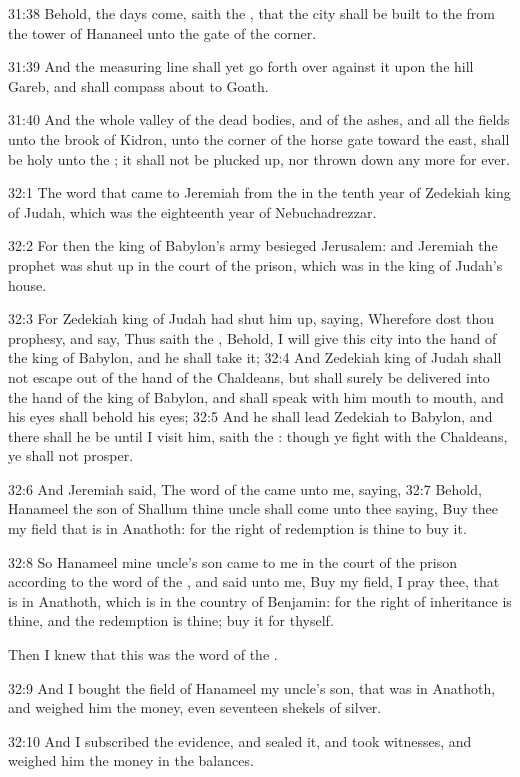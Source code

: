 31:38 Behold, the days come, saith the \LORD, that the city shall be built to the \LORD from the tower of Hananeel unto the gate of the corner.

31:39 And the measuring line shall yet go forth over against it upon the hill Gareb, and shall compass about to Goath.

31:40 And the whole valley of the dead bodies, and of the ashes, and all the fields unto the brook of Kidron, unto the corner of the horse gate toward the east, shall be holy unto the \LORD; it shall not be plucked up, nor thrown down any more for ever.

32:1 The word that came to Jeremiah from the \LORD in the tenth year of Zedekiah king of Judah, which was the eighteenth year of Nebuchadrezzar.

32:2 For then the king of Babylon's army besieged Jerusalem: and Jeremiah the prophet was shut up in the court of the prison, which was in the king of Judah's house.

32:3 For Zedekiah king of Judah had shut him up, saying, Wherefore dost thou prophesy, and say, Thus saith the \LORD, Behold, I will give this city into the hand of the king of Babylon, and he shall take it; 32:4 And Zedekiah king of Judah shall not escape out of the hand of the Chaldeans, but shall surely be delivered into the hand of the king of Babylon, and shall speak with him mouth to mouth, and his eyes shall behold his eyes; 32:5 And he shall lead Zedekiah to Babylon, and there shall he be until I visit him, saith the \LORD: though ye fight with the Chaldeans, ye shall not prosper.

32:6 And Jeremiah said, The word of the \LORD came unto me, saying, 32:7 Behold, Hanameel the son of Shallum thine uncle shall come unto thee saying, Buy thee my field that is in Anathoth: for the right of redemption is thine to buy it.

32:8 So Hanameel mine uncle's son came to me in the court of the prison according to the word of the \LORD, and said unto me, Buy my field, I pray thee, that is in Anathoth, which is in the country of Benjamin: for the right of inheritance is thine, and the redemption is thine; buy it for thyself.

Then I knew that this was the word of the \LORD.

32:9 And I bought the field of Hanameel my uncle's son, that was in Anathoth, and weighed him the money, even seventeen shekels of silver.

32:10 And I subscribed the evidence, and sealed it, and took witnesses, and weighed him the money in the balances.

